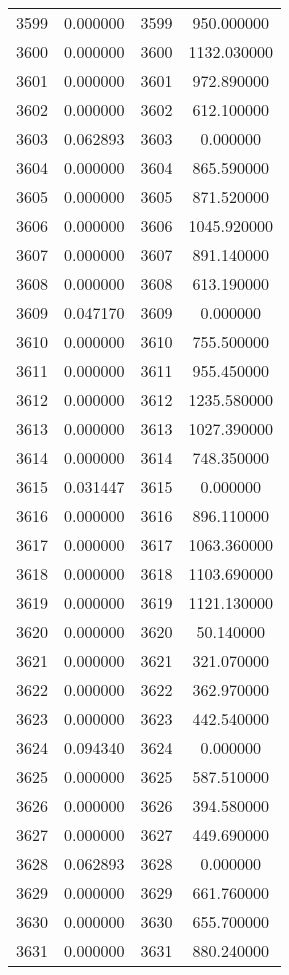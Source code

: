 \documentclass[12pt]{article}
\begin{document}
\begin{longtable}{@{}cccc@{}}
3599 & 0.000000 & 3599 & 950.000000 \\
3600 & 0.000000 & 3600 & 1132.030000 \\
3601 & 0.000000 & 3601 & 972.890000 \\
3602 & 0.000000 & 3602 & 612.100000 \\
3603 & 0.062893 & 3603 & 0.000000 \\
3604 & 0.000000 & 3604 & 865.590000 \\
3605 & 0.000000 & 3605 & 871.520000 \\
3606 & 0.000000 & 3606 & 1045.920000 \\
3607 & 0.000000 & 3607 & 891.140000 \\
3608 & 0.000000 & 3608 & 613.190000 \\
3609 & 0.047170 & 3609 & 0.000000 \\
3610 & 0.000000 & 3610 & 755.500000 \\
3611 & 0.000000 & 3611 & 955.450000 \\
3612 & 0.000000 & 3612 & 1235.580000 \\
3613 & 0.000000 & 3613 & 1027.390000 \\
3614 & 0.000000 & 3614 & 748.350000 \\
3615 & 0.031447 & 3615 & 0.000000 \\
3616 & 0.000000 & 3616 & 896.110000 \\
3617 & 0.000000 & 3617 & 1063.360000 \\
3618 & 0.000000 & 3618 & 1103.690000 \\
3619 & 0.000000 & 3619 & 1121.130000 \\
3620 & 0.000000 & 3620 & 50.140000 \\
3621 & 0.000000 & 3621 & 321.070000 \\
3622 & 0.000000 & 3622 & 362.970000 \\
3623 & 0.000000 & 3623 & 442.540000 \\
3624 & 0.094340 & 3624 & 0.000000 \\
3625 & 0.000000 & 3625 & 587.510000 \\
3626 & 0.000000 & 3626 & 394.580000 \\
3627 & 0.000000 & 3627 & 449.690000 \\
3628 & 0.062893 & 3628 & 0.000000 \\
3629 & 0.000000 & 3629 & 661.760000 \\
3630 & 0.000000 & 3630 & 655.700000 \\
3631 & 0.000000 & 3631 & 880.240000 \\

\end{longtable}
\end{document}
